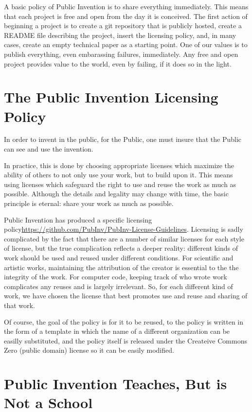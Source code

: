 \documentclass[
	fontsize=10pt, %
	twoside=false, %
	secnumdepth=1, %
]{kaobook}
\begin{document}
A basic policy of Public Invention is to share everything immediately.
This means that each project is free and open from the day it is conceived.
The first action of beginning a project is to create a git repository that
is publicly hosted, create a README file describing the project,
insert the licensing policy, and, in many cases, create an empty
technical paper as a starting point.
One of our values is to publish everything, even embarassing failures,
immediately.
Any free and open project provides value to the world, even by failing,
if it does so in the light.

\section{The Public Invention Licensing Policy}

In order to invent in the public, for the Public, one must
insure that the Public can see and use the invention.

In practice, this is done by choosing appropriate licenses
which maximize the ability of others to not only use your work,
but to build upon it.
This means using licenses which safeguard the right to use and
reuse the work as much as possible.
Although the details and legality may change with time,
the basic principle is eternal: share your work as much as possible.

Public Invention has produced a specific licensing policy\url{https://github.com/PubInv/PubInv-License-Guidelines}.
Licensing is sadly complicated by the fact that there are a number of similar licenses for
each style of license,
but the true complication reflects a deeper reality: different kinds
of work should be used and reused under different conditions.
For scientific and artistic works, maintaining the attribution of the creator is essential
to the the integrity of the work.
For computer code, keeping track of who wrote work complicates any reuses and
is largely irrelevant.
So, for each different kind of work, we have chosen the license that best promotes
use and reuse and sharing of that work.

Of course, the goal of the policy is for it to be reused, to the policy
is written in the form of a template in which the name of a different
organization can be easilly substituted, and the policy itself is released
under the Createive Commons Zero (public domain) license so it can be easily modified.

\section{Public Invention Teaches, But is Not a School}
\end{document}
